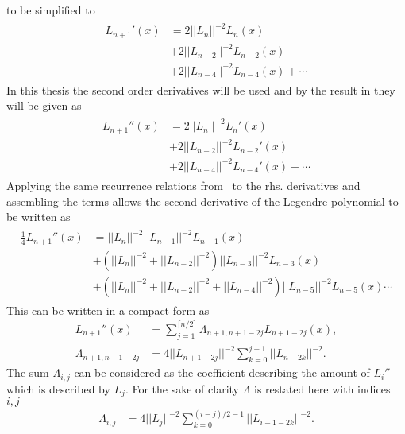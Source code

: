 to be simplified to 
\begin{align}
    \begin{split}
    L_{n+1}'(x) &= 2||L_n||^{-2}L_n(x)\\
    &+2||L_{n-2}||^{-2}L_{n-2}(x)\\
    &+2||L_{n-4}||^{-2}L_{n-4}(x)+\cdots 
    \end{split}
    \label{eq:der-explicit1}
\end{align}
In this thesis the second order derivatives will be used and by the result in  they will be given as 
\begin{align}
    \begin{split}
    L_{n+1}''(x) &= 2||L_n||^{-2}L_n'(x)\\
    &+2||L_{n-2}||^{-2}L_{n-2}'(x)\\
    &+2||L_{n-4}||^{-2}L_{n-4}'(x)+\cdots 
    \end{split}
    \label{eq:der-explicit2}
\end{align}
Applying the same recurrence relations from~ to the rhs. derivatives and assembling the terms allows the 
second derivative of the Legendre polynomial to be written as 
\begin{align}
    \begin{split}
        \frac{1}{4}L_{n+1}''(x) &= ||L_n||^{-2}||L_{n-1}||^{-2}L_{n-1}(x)\\
        &+\left( ||L_n||^{-2}+||L_{n-2}||^{-2} \right)||L_{n-3}||^{-2}L_{n-3}(x)\\
        &+\left( ||L_n||^{-2}+||L_{n-2}||^{-2}+||L_{n-4}||^{-2} \right)||L_{n-5}||^{-2}L_{n-5}(x) \cdots
    \end{split}
    \label{eq:laplacian-explicit}
\end{align}
This can be written in a compact form as
\begin{align}
    L_{n+1}''(x) &= \sum_{j=1}^{\lceil n/2 \rceil}\Lambda_{n+1,n+1-2j}L_{n+1-2j}(x),\\
    \Lambda_{n+1,n+1-2j} &= 4||L_{n+1-2j}||^{-2}\sum_{k=0}^{j-1}||L_{n-2k}||^{-2}.
    \label{eq:legendresummation}
\end{align}
The sum $\Lambda_{i,j}$ can be considered as the coefficient describing the amount of $L_i''$ 
which is described by $L_j$. For the sake of clarity $\Lambda$ is restated here with indices $i,j$
\begin{align}
    \Lambda_{i,j} &= 4||L_{j}||^{-2}\sum_{k=0}^{(i-j)/2-1}||L_{i-1-2k}||^{-2}.
    \label{eq:legendresummation}
\end{align}
